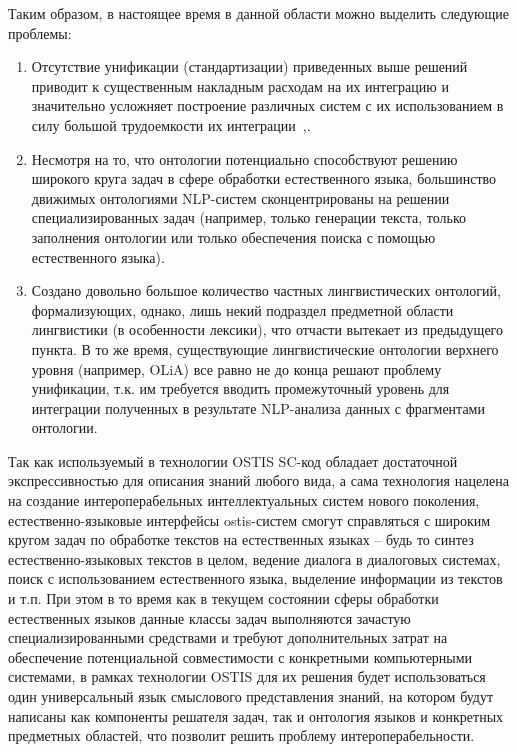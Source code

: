 Таким образом, в настоящее время в данной области можно выделить следующие проблемы:
\begin{enumerate}
    \item Отсутствие унификации (стандартизации) приведенных выше решений приводит к существенным накладным расходам на их интеграцию и значительно усложняет построение различных систем с их использованием в силу большой трудоемкости их интеграции~\cite{Standart2021},\cite{GolenkovProblems2021}.
    \item Несмотря на то, что онтологии потенциально способствуют решению широкого круга задач в сфере обработки естественного языка, большинство движимых онтологиями NLP-систем сконцентрированы на решении специализированных задач (например, только генерации текста, только заполнения онтологии или только обеспечения поиска с помощью естественного языка).
    \item Создано довольно большое количество частных лингвистических онтологий, формализующих, однако, лишь некий подраздел предметной области лингвистики (в особенности лексики), что отчасти вытекает из предыдущего пункта. В то же время, существующие лингвистические онтологии верхнего уровня (например, OLiA) все равно не до конца решают проблему унификации, т.к. им требуется вводить промежуточный уровень для интеграции полученных в результате NLP-анализа данных с фрагментами онтологии.
\end{enumerate}

Так как используемый в технологии OSTIS SC-код обладает достаточной экспрессивностью для описания знаний любого вида, а сама технология нацелена на создание интероперабельных интеллектуальных систем нового поколения, естественно-языковые интерфейсы ostis-систем смогут справляться с широким кругом задач по обработке текстов на естественных языках -- будь то синтез естественно-языковых текстов в целом, ведение диалога в диалоговых системах, поиск с использованием естественного языка, выделение информации из текстов и т.п. При этом в то время как в текущем состоянии сферы обработки естественных языков данные классы задач выполняются зачастую специализированными средствами и требуют дополнительных затрат на обеспечение потенциальной совместимости с конкретными компьютерными системами, в рамках технологии OSTIS для их решения будет использоваться один универсальный язык смыслового представления знаний, на котором будут написаны как компоненты решателя задач, так и онтология языков и конкретных предметных областей, что позволит решить проблему интероперабельности.

